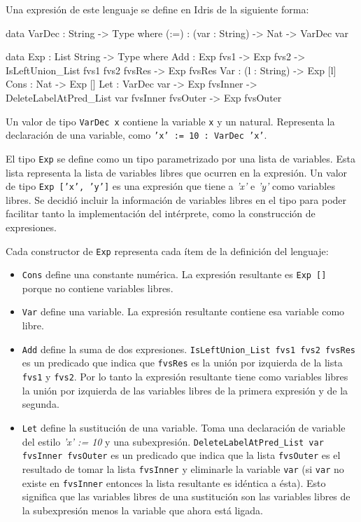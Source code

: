 Una expresión de este lenguaje se define en Idris de la siguiente forma:

\begin{code}
data VarDec : String -> Type where
  (:=) : (var : String) -> Nat -> VarDec var

data Exp : List String -> Type where
  Add : Exp fvs1 -> Exp fvs2 -> 
    IsLeftUnion_List fvs1 fvs2 fvsRes -> 
    Exp fvsRes 
  Var : (l : String) -> Exp [l]
  Cons : Nat -> Exp []
  Let : VarDec var -> Exp fvsInner -> 
    DeleteLabelAtPred_List var fvsInner fvsOuter -> 
    Exp fvsOuter
\end{code}

Un valor de tipo \texttt{VarDec x} contiene la variable \texttt{x} y un natural. Representa la declaración de una variable, como \texttt{'x' := 10 : VarDec 'x'}.

El tipo \texttt{Exp} se define como un tipo parametrizado por una lista de variables. Esta lista representa la lista de variables libres que ocurren en la expresión. Un valor de tipo \texttt{Exp ['x', 'y']} es una expresión que tiene a \textit{'x'} e \textit{'y'} como variables libres. Se decidió incluir la información de variables libres en el tipo para poder facilitar tanto la implementación del intérprete, como la construcción de expresiones.

Cada constructor de \texttt{Exp} representa cada ítem de la definición del lenguaje:
\begin{itemize}
\item \texttt{Cons} define una constante numérica. La expresión resultante es \texttt{Exp []} porque no contiene variables libres. 
\item \texttt{Var} define una variable. La expresión resultante contiene esa variable como libre.
\item \texttt{Add} define la suma de dos expresiones. \texttt{IsLeftUnion\_List fvs1 fvs2 fvsRes} es un predicado que indica que \texttt{fvsRes} es la unión por izquierda de la lista \texttt{fvs1} y \texttt{fvs2}. Por lo tanto la expresión resultante tiene como variables libres la unión por izquierda de las variables libres de la primera expresión y de la segunda.
\item \texttt{Let} define la sustitución de una variable. Toma una declaración de variable del estilo \textit{'x' := 10} y una subexpresión. \texttt{DeleteLabelAtPred\_List var fvsInner fvsOuter} es un predicado que indica que la lista \texttt{fvsOuter} es el resultado de tomar la lista \texttt{fvsInner} y eliminarle la variable \texttt{var} (si \texttt{var} no existe en \texttt{fvsInner} entonces la lista resultante es idéntica a ésta). Esto significa que las variables libres de una sustitución son las variables libres de la subexpresión menos la variable que ahora está ligada.
\end{itemize}

